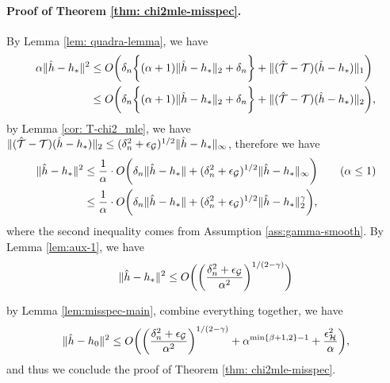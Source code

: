 \paragraph{Proof of Theorem \ref{thm: chi2mle-misspec}.}
By Lemma \ref{lem: quadra-lemma}, we have \begin{align*}
    \alpha \|\hat{h} - h_{*}\|^2 &\leq  O\bigg(\delta_n\bigg\{ (\alpha+1) \|\hat h-h_*\|_2  +     \delta_n   \bigg\}+  \|(\hat {{\mathcal{T}}}-{\mathcal{T}})(\hat h-h_*)\|_1\bigg)\\
    &\leq O\bigg(\delta_n\bigg\{ (\alpha+1) \|\hat h-h_*\|_2  +     \delta_n   \bigg\}+  \|(\hat {{\mathcal{T}}}-{\mathcal{T}})(\hat h-h_*)\|_2\bigg),
\end{align*}
by Lemma \ref{cor: T-chi2_mle}, we have $\|(\hat {{\mathcal{T}}}-{\mathcal{T}})(\hat h-h_*)\|_2\leq (\delta_n^2+\epsilon_{\mathcal{G}})^{1/2}\|\hat h-h_*\|_\infty$, therefore we have \begin{align*}
\|\hat{h} - h_*\|^2 &\leq \frac{1}{\alpha}\cdot O\bigg(\delta_n \|\hat{h} - h_*\| +  (\delta_n^2 +\epsilon_{\mathcal{G}} )^{1/2}\|\hat{h} - h_*\|_\infty\bigg)\tag{$\alpha\leq 1$}\\
&\leq \frac{1}{\alpha}\cdot O\bigg(\delta_n\|\hat{h} - h_*\|+ (\delta_n^2 +\epsilon_{\mathcal{G}} )^{1/2}\|\hat{h} - h_*\|_2^\gamma\bigg),
\end{align*}
where the second inequality comes from Assumption \ref{ass:gamma-smooth}. By Lemma \ref{lem:aux-1}, we have 
\begin{align}
    \|\hat{h} - h_*\|^2 \leq O\bigg(\bigg(\frac{\delta_n^2+\epsilon_{\mathcal{G}}}{\alpha^2} \bigg)^{1/(2-\gamma)}\bigg)
    \label{eqn: misspec_only_G_chi2}
\end{align}

by Lemma \ref{lem:misspec-main}, combine everything together,  we have $$
\|\hat{h} - h_0\|^2 \leq O\bigg(\bigg(\frac{\delta_n^2+\epsilon_{\mathcal{G}}}{\alpha^2} \bigg)^{1/(2-\gamma)}+ \alpha^{\min\{\beta+1,2\}-1}+\frac{\epsilon_{\mathcal{H}}^2}{\alpha}\bigg),
$$ 
and thus we conclude the proof of Theorem \ref{thm: chi2mle-misspec}.

